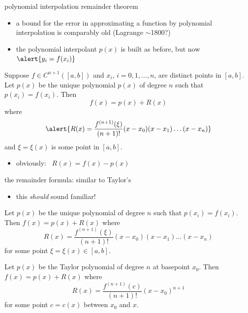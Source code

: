 \documentclass[10pt,
               svgnames,
               hyperref={colorlinks,
                         citecolor=DeepPink4,
                         linkcolor=FireBrick,
                         urlcolor=blue},
               usepdftitle=false]{beamer}
\begin{document}
\begin{frame}{polynomial interpolation remainder theorem}

\begin{itemize}
\item a bound for the error in approximating a function by polynomial interpolation is comparably old (Lagrange $\sim$1800?)
\item the polynomial interpolant $p(x)$ is built as before, but now $\alert{y_i=f(x_i)}$
\end{itemize}

\begin{theorem}
Suppose $f\in C^{n+1}([a,b])$ and $x_i$, $i=0,1,\dots,n$, are distinct points in $[a,b]$.  Let $p(x)$ be the unique polynomial $p(x)$ of degree $n$ such that $p(x_i)=f(x_i)$.  Then
	$$f(x) = p(x) + R(x)$$
where
    $$\alert{R(x) = \frac{f^{(n+1)}(\xi)}{(n+1)!} (x-x_0)(x-x_1)\dots(x-x_n)}$$
and \alert{$\xi=\xi(x)$} is some point in $[a,b]$.
\end{theorem}

\begin{itemize}
\item obviously: \, $R(x)=f(x)-p(x)$
\end{itemize}

\end{frame}


\begin{frame}{the remainder formula: similar to Taylor's}

\begin{itemize}
\item this \emph{should} sound familiar!
\end{itemize}

\begin{theorem}
Let $p(x)$ be the unique polynomial of degree $n$ such that $p(x_i)=f(x_i)$.  Then $f(x) = p(x) + R(x)$ where
    $$R(x) = \frac{f^{(n+1)}(\xi)}{(n+1)!} (x-x_0)(x-x_1)\dots(x-x_n)$$
for some point $\xi=\xi(x) \in [a,b]$.
\end{theorem}

\begin{theorem}
Let $p(x)$ be the Taylor polynomial of degree $n$ at basepoint $x_0$.  Then $f(x) = p(x) + R(x)$ where
    $$R(x) = \frac{f^{(n+1)}(c)}{(n+1)!} (x-x_0)^{n+1}$$
for some point $c=c(x)$ between $x_0$ and $x$.
\end{theorem}
\end{frame}
\end{document}

